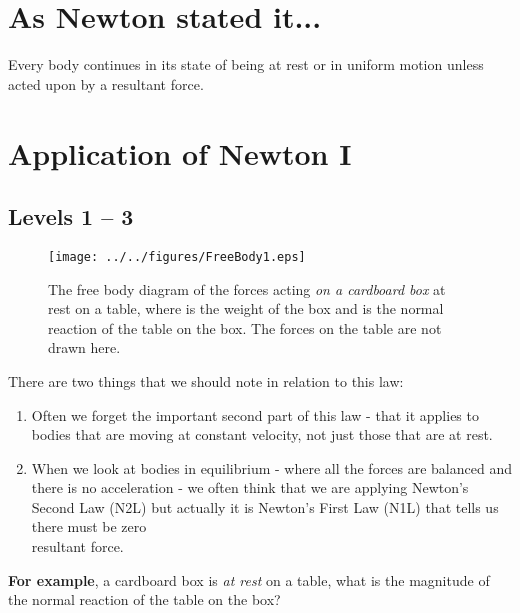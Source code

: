 




\addtolength{\topmargin}{-0.6 cm}
\setlength{\columnsep}{22pt}

\section{As Newton stated it...}

Every body continues in its state of being at rest or in uniform motion unless acted upon by a resultant force.

\setlength{\columnsep}{22pt}
\section{Application of Newton I}
\subsection*{Levels 1 -- 3}
\begin{wrapfigure}{r}{6cm}
\vspace{-3.0cm}
\center
\texttt{[image: ../../figures/FreeBody1.eps]}
\caption{The free body diagram of the forces acting \emph{on a cardboard box} at rest on a table, where  is the weight of the box and  is the normal reaction of the table on the box.  The forces on the table are not drawn here.}\vspace{-3.5cm}
\end{wrapfigure}

There are two things that we should note in relation to this law:
\begin{enumerate}
\item Often we forget the important second part of this law - that it applies to bodies that are moving at constant velocity, not just those that are at rest.   

\item When we look at bodies in equilibrium - where all the forces are balanced and there is no acceleration - we often think that we are applying Newton's Second Law (N2L) but actually it is Newton's First Law (N1L) that tells us there must be zero\\
resultant force.

\end{enumerate}
{\bf For example}, a cardboard box is \emph{at rest} on a table, what is the magnitude of the normal reaction of the table on the box? \\

